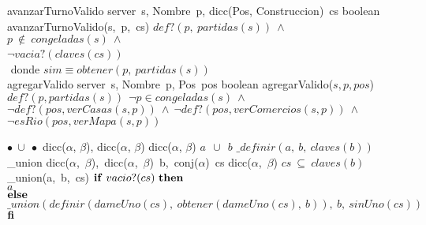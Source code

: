 \tadOperacion
    {avanzarTurnoValido}
    {server\ s, Nombre\ p, dicc(Pos, Construccion)\ cs}
    {boolean}
    {}
\tadAxioma
    {avanzarTurnoValido(s,\ p,\ cs)}
    {$
        def?(p,\ partidas(s))\ \land\ $\\$
        p\ \notin\ congeladas(s)\ \land\ $\\$ 
        \neg vacia?(claves(cs))\ $\yluego\ \\$
    $}
\tab donde $sim \equiv obtener(p,\ partidas(s))$  
\\
\tadOperacion
    {agregarValido}
    {server\ s, Nombre\ p, Pos\ pos}
    {boolean}
    {}
\tadAxioma
    {agregarValido($s, p, pos$)}
    {$
        def?(p, partidas(s))\ $\yluego$\ \lnot p \in congeladas(s)\ \wedge\ $\\$
        \lnot def?(pos, verCasas(s, p))\ \wedge\ \lnot def?(pos, verComercios(s, p))\ \wedge\ $\\$
        \lnot esRio(pos, verMapa(s, p)) $\\$
$}

\tadOperacion
    {$\bullet\ \cup\ \bullet$}
    {dicc($\alpha$, $\beta$), dicc($\alpha$, $\beta$)}
    {dicc($\alpha$, $\beta$)}
    {}
\tadAxioma
    {$a\ \ \cup\ \ b$}
    {$ \_definir(a,\ b,\ claves(b))$}
\vspace{4mm}
\tadOperacion
    {\_union}
    {dicc($\alpha$,\ $\beta$),\ dicc($\alpha$,\ $\beta$)\ b,\ conj($\alpha$)\ cs}
    {dicc($\alpha$,\ $\beta$)}
    {$cs\ \subseteq\ claves(b)$}
\tadAxioma
    {\_union(a,\ b,\ cs)}
    {$ 
    \LIF\ vacio?(cs)\ \LTHEN\ $\\$ 
    $\tab$ a $\\$
    \textrm{\textbf{else}} $\\$ 
    $\tab$ \_union(definir(dameUno(cs),\ obtener(dameUno(cs),\ b)),\ b,\ sinUno(cs)) $\\$ 
    \textrm{\textbf{fi}}
    $}